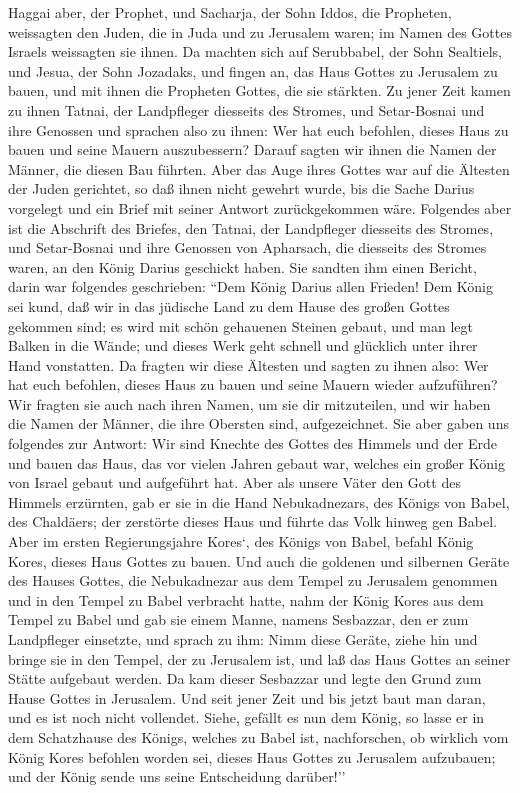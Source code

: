  Haggai aber, der Prophet, und Sacharja, der Sohn Iddos,
die Propheten, weissagten den Juden, die in Juda und zu Jerusalem waren;
im Namen des Gottes Israels weissagten sie ihnen.  Da
machten sich auf Serubbabel, der Sohn Sealtiels, und Jesua, der Sohn
Jozadaks, und fingen an, das Haus Gottes zu Jerusalem zu bauen, und mit
ihnen die Propheten Gottes, die sie stärkten.  Zu jener
Zeit kamen zu ihnen Tatnai, der Landpfleger diesseits des Stromes, und
Setar-Bosnai und ihre Genossen und sprachen also zu ihnen: Wer hat euch
befohlen, dieses Haus zu bauen und seine Mauern auszubessern?
 Darauf sagten wir ihnen die Namen der Männer, die diesen
Bau führten.  Aber das Auge ihres Gottes war auf die
Ältesten der Juden gerichtet, so daß ihnen nicht gewehrt wurde, bis die
Sache Darius vorgelegt und ein Brief mit seiner Antwort zurückgekommen
wäre.  Folgendes aber ist die Abschrift des Briefes, den
Tatnai, der Landpfleger diesseits des Stromes, und Setar-Bosnai und ihre
Genossen von Apharsach, die diesseits des Stromes waren, an den König
Darius geschickt haben.  Sie sandten ihm einen Bericht,
darin war folgendes geschrieben: ``Dem König Darius allen Frieden!
 Dem König sei kund, daß wir in das jüdische Land zu dem
Hause des großen Gottes gekommen sind; es wird mit schön gehauenen
Steinen gebaut, und man legt Balken in die Wände; und dieses Werk geht
schnell und glücklich unter ihrer Hand vonstatten.  Da
fragten wir diese Ältesten und sagten zu ihnen also: Wer hat euch
befohlen, dieses Haus zu bauen und seine Mauern wieder aufzuführen?
 Wir fragten sie auch nach ihren Namen, um sie dir
mitzuteilen, und wir haben die Namen der Männer, die ihre Obersten sind,
aufgezeichnet.  Sie aber gaben uns folgendes zur Antwort:
Wir sind Knechte des Gottes des Himmels und der Erde und bauen das Haus,
das vor vielen Jahren gebaut war, welches ein großer König von Israel
gebaut und aufgeführt hat.  Aber als unsere Väter den
Gott des Himmels erzürnten, gab er sie in die Hand Nebukadnezars, des
Königs von Babel, des Chaldäers; der zerstörte dieses Haus und führte
das Volk hinweg gen Babel.  Aber im ersten
Regierungsjahre Kores`, des Königs von Babel, befahl König Kores, dieses
Haus Gottes zu bauen.  Und auch die goldenen und
silbernen Geräte des Hauses Gottes, die Nebukadnezar aus dem Tempel zu
Jerusalem genommen und in den Tempel zu Babel verbracht hatte, nahm der
König Kores aus dem Tempel zu Babel und gab sie einem Manne, namens
Sesbazzar, den er zum Landpfleger einsetzte,  und sprach
zu ihm: Nimm diese Geräte, ziehe hin und bringe sie in den Tempel, der
zu Jerusalem ist, und laß das Haus Gottes an seiner Stätte aufgebaut
werden.  Da kam dieser Sesbazzar und legte den Grund zum
Hause Gottes in Jerusalem. Und seit jener Zeit und bis jetzt baut man
daran, und es ist noch nicht vollendet.  Siehe, gefällt
es nun dem König, so lasse er in dem Schatzhause des Königs, welches zu
Babel ist, nachforschen, ob wirklich vom König Kores befohlen worden
sei, dieses Haus Gottes zu Jerusalem aufzubauen; und der König sende uns
seine Entscheidung darüber!''

